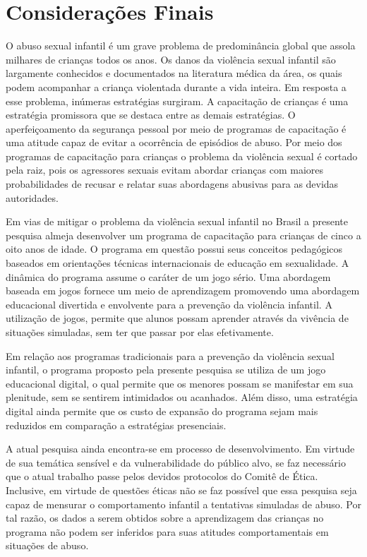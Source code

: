 \chapter{Considerações Finais}\label{ch:Conclusao}


O abuso sexual infantil é um grave problema de predominância global que assola milhares de crianças todos os anos. Os danos da violência sexual infantil são largamente conhecidos e documentados na literatura médica da área, os quais podem acompanhar a criança violentada durante a vida inteira. Em resposta a esse problema, inúmeras estratégias surgiram. A capacitação de crianças é uma estratégia promissora que se destaca entre as demais estratégias. O aperfeiçoamento da segurança pessoal por meio de programas de capacitação é uma atitude capaz de evitar a ocorrência de episódios de abuso. Por meio dos programas de capacitação para crianças o problema da violência sexual é cortado pela raiz, pois os agressores sexuais evitam abordar crianças com maiores probabilidades de recusar e relatar suas abordagens abusivas para as devidas autoridades. 

Em vias de mitigar o problema da violência sexual infantil no Brasil a presente pesquisa almeja desenvolver um programa de capacitação para crianças de cinco a oito anos de idade. O programa em questão possui seus conceitos pedagógicos baseados em orientações técnicas internacionais de educação em sexualidade. A dinâmica do programa assume o caráter de um jogo sério. Uma abordagem baseada em jogos fornece um meio de aprendizagem promovendo uma abordagem educacional divertida e envolvente para a prevenção da violência infantil. A utilização de jogos, permite que alunos possam aprender através da vivência de situações simuladas, sem ter que passar por elas efetivamente.

Em relação aos programas tradicionais para a prevenção da violência sexual infantil, o programa proposto pela presente pesquisa se utiliza de um jogo educacional digital, o qual permite que os menores possam se manifestar em sua plenitude, sem se sentirem intimidados ou acanhados. 
Além disso, uma estratégia digital ainda permite que os custo de expansão do programa sejam mais reduzidos em comparação a estratégias presenciais. 

A atual pesquisa ainda encontra-se em processo de desenvolvimento. Em virtude de sua temática sensível e da vulnerabilidade do público alvo, se faz necessário que o atual trabalho passe pelos devidos protocolos do Comitê de Ética. Inclusive, em virtude de questões éticas não se faz possível que essa pesquisa seja capaz de mensurar o comportamento infantil a tentativas simuladas de abuso. Por tal razão, os dados a serem obtidos sobre a aprendizagem das crianças no programa não podem ser inferidos para suas atitudes comportamentais em situações de abuso. 

